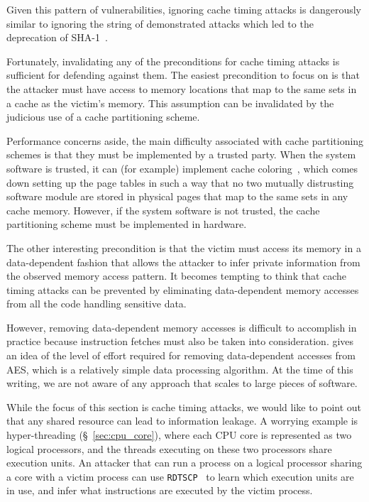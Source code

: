 Given this pattern of vulnerabilities, ignoring cache timing attacks is
dangerously similar to ignoring the string of demonstrated attacks which led to
the deprecation of SHA-1~\cite{nist2014sha1policy, google2014sha1deprecation,
microsoft2014sha1deprecation}.


\label{sec:cache_timing_workarounds}

Fortunately, invalidating any of the preconditions for cache timing attacks is
sufficient for defending against them. The easiest precondition to focus on is
that the attacker must have access to memory locations that map to the same
sets in a cache as the victim's memory. This assumption can be invalidated by
the judicious use of a cache partitioning scheme.

Performance concerns aside, the main difficulty associated with cache
partitioning schemes is that they must be implemented by a trusted party. When
the system software is trusted, it can (for example) implement cache
coloring~\cite{taylor1990coloring}, which comes down setting up the page tables
in such a way that no two mutually distrusting software module are stored in
physical pages that map to the same sets in any cache memory. However, if the
system software is not trusted, the cache partitioning scheme must be
implemented in hardware.

The other interesting precondition is that the victim must access its memory in
a data-dependent fashion that allows the attacker to infer private information
from the observed memory access pattern. It becomes tempting to think that
cache timing attacks can be prevented by eliminating data-dependent memory
accesses from all the code handling sensitive data.

However, removing data-dependent memory accesses is difficult to accomplish in
practice because instruction fetches must also be taken into consideration.
\cite{kasper2009aes} gives an idea of the level of effort required for removing
data-dependent accesses from AES, which is a relatively simple data processing
algorithm. At the time of this writing, we are not aware of any approach that
scales to large pieces of software.

While the focus of this section is cache timing attacks, we would like to point
out that any shared resource can lead to information leakage. A worrying
example is hyper-threading (\S~\ref{sec:cpu_core}), where each CPU core is
represented as two logical processors, and the threads executing on these two
processors share execution units. An attacker that can run a process on a
logical processor sharing a core with a victim process can use
\texttt{RDTSCP}~\cite{petters1999making} to learn which execution units are in
use, and infer what instructions are executed by the victim process.
